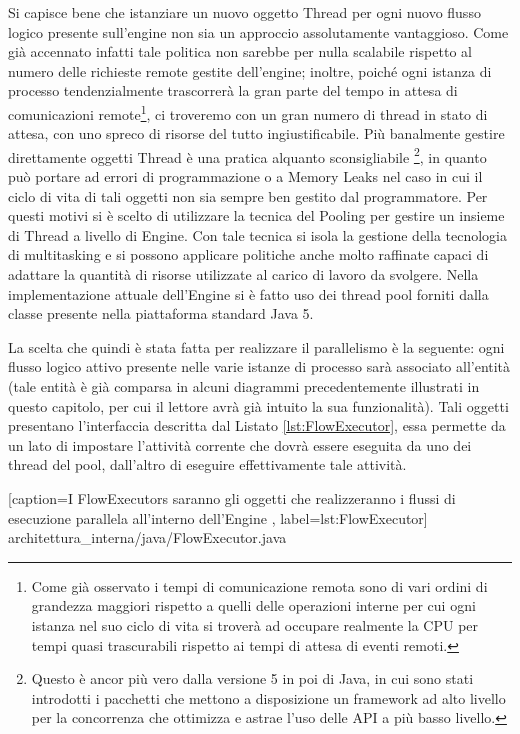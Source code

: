 Si capisce bene che istanziare un nuovo oggetto Thread per ogni nuovo flusso
logico presente sull'engine non sia un approccio assolutamente vantaggioso. Come
già accennato infatti tale politica non sarebbe per nulla scalabile rispetto al
numero delle richieste remote gestite dell'engine; inoltre, poiché ogni istanza
di processo tendenzialmente trascorrerà la gran parte del tempo in attesa di
comunicazioni remote\footnote{Come già osservato i tempi di comunicazione remota
sono di vari ordini di grandezza maggiori rispetto a quelli delle operazioni
interne per cui ogni istanza nel suo ciclo di vita si troverà ad occupare
realmente la CPU per tempi quasi trascurabili rispetto ai tempi di attesa di
eventi remoti.}, ci troveremo con un gran numero di thread in stato di attesa,
con uno spreco di risorse del tutto ingiustificabile. Più banalmente gestire
direttamente oggetti Thread \`e una pratica alquanto sconsigliabile
\footnote{Questo \`e ancor pi\`u vero dalla versione 5 in poi di Java, in cui
sono stati introdotti i pacchetti  che mettono a
disposizione un framework ad alto livello per la concorrenza che ottimizza e
astrae l'uso delle API a più basso livello.}, in quanto può portare ad errori di
programmazione o a Memory Leaks nel caso in cui il ciclo di vita di tali oggetti
non sia sempre ben gestito dal programmatore. Per questi motivi si \`e scelto di
utilizzare la tecnica del Pooling per gestire un insieme di Thread a livello di
Engine. Con tale tecnica si isola la gestione della tecnologia di multitasking e
si possono applicare politiche anche molto raffinate capaci di adattare la
quantità di risorse utilizzate al carico di lavoro da svolgere. Nella
implementazione attuale dell'Engine si \`e fatto uso dei thread pool forniti
dalla classe  presente nella piattaforma
standard Java 5.
 
La scelta che quindi \`e stata fatta per realizzare il parallelismo \`e la
seguente: ogni flusso logico attivo presente nelle varie istanze di processo sarà
associato all'entità  (tale entità \`e già comparsa in alcuni
diagrammi precedentemente illustrati in questo capitolo, per cui il lettore avrà
già intuito la sua funzionalità). Tali oggetti presentano l'interfaccia
descritta dal Listato \ref{lst:FlowExecutor}, essa permette da un lato di
impostare l'attività corrente che dovrà essere eseguita da uno dei thread del pool, 
dall'altro di eseguire effettivamente tale attività.


[caption={I FlowExecutors saranno gli oggetti che realizzeranno i flussi di
esecuzione parallela all'interno dell'Engine }, label=lst:FlowExecutor]
{architettura_interna/java/FlowExecutor.java}

